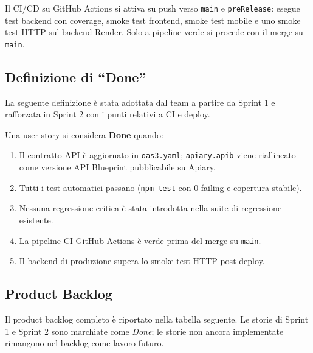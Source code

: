 \documentclass[11pt,a4paper]{article}
\newcommand{\code}[1]{\texttt{#1}}
\begin{document}
Il CI/CD su GitHub Actions si attiva su push verso \code{main} e \code{preRelease}: esegue test backend con coverage, smoke test frontend, smoke test mobile e uno smoke test HTTP sul backend Render. Solo a pipeline verde si procede con il merge su \code{main}.

\subsection{Definizione di ``Done''}

La seguente definizione è stata adottata dal team a partire da Sprint 1 e rafforzata in Sprint 2 con i punti relativi a CI e deploy.

Una user story si considera \textbf{Done} quando:
\begin{enumerate}[noitemsep]
  \item Il contratto API è aggiornato in \code{oas3.yaml}; \code{apiary.apib} viene riallineato come versione API Blueprint pubblicabile su Apiary.
  \item Tutti i test automatici passano (\code{npm test} con 0 failing e copertura stabile).
  \item Nessuna regressione critica è stata introdotta nella suite di regressione esistente.
  \item[\textit{S2}] La pipeline CI GitHub Actions è verde prima del merge su \code{main}.
  \item[\textit{S2}] Il backend di produzione supera lo smoke test HTTP post-deploy.
\end{enumerate}

\subsection{Product Backlog}

Il product backlog completo è riportato nella tabella seguente. Le storie di Sprint 1 e Sprint 2 sono marchiate come \textit{Done}; le storie non ancora implementate rimangono nel backlog come lavoro futuro.
\end{document}
